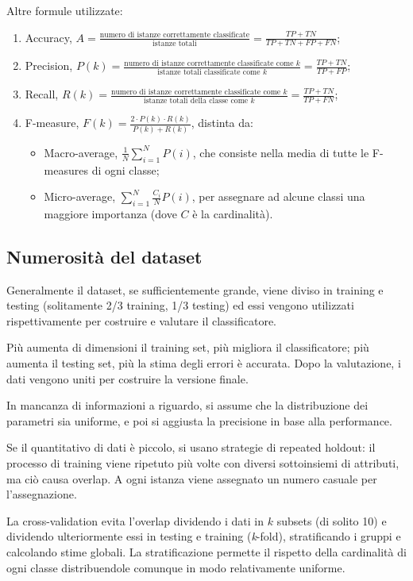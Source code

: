 Altre formule utilizzate:
\begin{enumerate}
	\item Accuracy, $A = \frac{\text{numero di istanze correttamente classificate}}{\text{istanze totali}} = \frac{TP + TN}{TP + TN + FP + FN}$;
	\item Precision, $P(k) = \frac{\text{numero di istanze correttamente classificate come }k}{\text{istanze totali classificate come }k} = \frac{TP + TN}{TP + FP}$;
	\item Recall, $R(k) = \frac{\text{numero di istanze correttamente classificate come }k}{\text{istanze totali della classe come }k} = \frac{TP + TN}{TP + FN}$;
	\item F-measure, $F(k) = \frac{2 \cdot P(k) \cdot R(k)}{P(k) + R(k)}$, distinta da:
	\begin{itemize}
		\item Macro-average, $\frac{1}{N} \sum_{i=1}^{N} P(i)$, che consiste nella media di tutte le F-measures di ogni classe;
		\item Micro-average, $\sum_{i=1}^{N} \frac{C_i}{N} P(i)$, per assegnare ad alcune classi una maggiore importanza (dove $C$ è la cardinalità).
	\end{itemize}
\end{enumerate}

\subsection{Numerosità del dataset}
Generalmente il dataset, se sufficientemente grande, viene diviso in training e testing (solitamente 2/3 training, 1/3 testing) ed essi vengono utilizzati rispettivamente per costruire e valutare il classificatore.

Più aumenta di dimensioni il training set, più migliora il classificatore; più aumenta il testing set, più la stima degli errori è accurata. Dopo la valutazione, i dati vengono uniti per costruire la versione finale.

In mancanza di informazioni a riguardo, si assume che la distribuzione dei parametri sia uniforme, e poi si aggiusta la precisione in base alla performance.

Se il quantitativo di dati è piccolo, si usano strategie di repeated holdout: il processo di training viene ripetuto più volte con diversi sottoinsiemi di attributi, ma ciò causa overlap. A ogni istanza viene assegnato un numero casuale per l'assegnazione.

La cross-validation evita l'overlap dividendo i dati in $k$ subsets (di solito 10) e dividendo ulteriormente essi in testing e training (\textit{k}-fold), stratificando i gruppi e calcolando stime globali. La stratificazione permette il rispetto della cardinalità di ogni classe distribuendole comunque in modo relativamente uniforme. 

